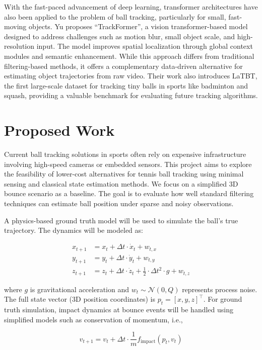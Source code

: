 \documentclass[conference]{IEEEtran}
\begin{document}
With the fast-paced advancement of deep learning, transformer architectures have also been applied to the problem of ball tracking, particularly for small, fast-moving objects. Yu \cite{b17} proposes “TrackFormer”, a vision transformer-based model designed to address challenges such as motion blur, small object scale, and high-resolution input. The model improves spatial localization through global context modules and semantic enhancement. While this approach differs from traditional filtering-based methods, it offers a complementary data-driven alternative for estimating object trajectories from raw video. Their work also introduces LaTBT, the first large-scale dataset for tracking tiny balls in sports like badminton and squash, providing a valuable benchmark for evaluating future tracking algorithms.


\section{Proposed Work}
Current ball tracking solutions in sports often rely on expensive infrastructure involving high-speed cameras or embedded sensors. This project aims to explore the feasibility of lower-cost alternatives for tennis ball tracking using minimal sensing and classical state estimation methods. We focus on a simplified 3D bounce scenario as a baseline. The goal is to evaluate how well standard filtering techniques can estimate ball position under sparse and noisy observations.

A physics-based ground truth model will be used to simulate the ball's true trajectory. The dynamics will be modeled as:

\begin{align*}
x_{t+1} &= x_t + \Delta t \cdot \dot{x}_t + w_{t,x} \\
y_{t+1} &= y_t + \Delta t \cdot \dot{y}_t + w_{t,y} \\
z_{t+1} &= z_t + \Delta t \cdot \dot{z}_t + \frac{1}{2}\cdot\Delta t^2 \cdot g + w_{t,z}
\end{align*}

where $g$ is gravitational acceleration and $w_t \sim \mathcal{N}(0, Q)$ represents process noise. The full state vector (3D position coordinates) is $p_t = [x, y, z]^\top$. For ground truth simulation, impact dynamics at bounce events will be handled using simplified models such as conservation of momentum, i.e.,

\[
v_{t+1} = v_t + \Delta t \cdot \frac{1}{m} f_{\text{impact}}(p_t, v_t)
\]
\end{document}
